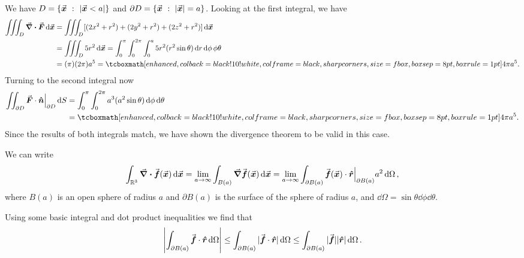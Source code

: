 We have $D = \{ \va*{x}~:~|\va*{x} < a| \}$ and $\partial D = \{ \va*{x}~:~|\va*{x}|=a \}$.
Looking at the first integral, we have
\begin{align}
    \label{eq:first-int}
    \iiint_{D} \div{\va*{F}} \dd{\va*{x}} &= \iiint_{D} [(2x^2 + r^2) + (2y^2 + r^2) + (2z^2 + r^2)] \dd{\va*{x}} \notag \\
                                          &= \iiint_{D} 5r^2 \dd{\va*{x}} = \int_{0}^{\pi}\int_{0}^{2\pi}\int_{0}^{a} 5r^2 (r^2 \sin{\theta})\dd{r}\dd{\phi}\phi{\theta} \notag \\
                                          &= (\pi)(2\pi)a^{5} = \eqbox{4 \pi a^{5}}
.\end{align}
Turning to the second integral now
\begin{align}
    \label{eq:sec-int}
    \iint_{\partial D} \va*{F} \cdot \vu*{n}\Bigr|_{\partial D} \dd{S} &= \int_{0}^{\pi}\int_{0}^{2\pi} a^3 (a^{2} \sin{\theta})\dd{\phi}\dd{\theta} \notag \\
                                                                       &= \eqbox{4\pi a^{5}}
.\end{align}
Since the results of both integrals match, we have shown the divergence theorem to be valid in this case.


We can write
\begin{eqnarray}
    \label{eq:int-limit}
    \int_{\mathbb{R}^{3}} \div{\va*{f}(\va*{x})} \dd{\va*{x}} = \lim_{a \rightarrow \infty} \int_{B(a)} \grad{\va*{f}(\va*{x})} \dd{\va*{x}} = \lim_{a \rightarrow \infty} \int_{\partial B(a)} \va*{f}(\va*{x}) \cdot \vu*{r}\Bigr|_{\partial B(a)} a^2 \dd{\Omega}
,\end{eqnarray}
where $B(a)$ is an open sphere of radius $a$ and $\partial B(a)$ is the surface of the sphere of radius $a$, and $\dd{\Omega} = \sin{\theta} \dd{\phi}\dd{\theta}$.

Using some basic integral and dot product inequalities we find that
\begin{eqnarray}
    \label{eq:inequality-int}
    \left| \int_{\partial B(a)} \va*{f} \cdot \vu*{r} \dd{\Omega} \right| \leq \int_{\partial B(a)} |\va*{f} \cdot \vu*{r}| \dd{\Omega} \leq \int_{\partial B(a)} |\va*{f}| |\vu*{r}| \dd{\Omega}
.\end{eqnarray}

